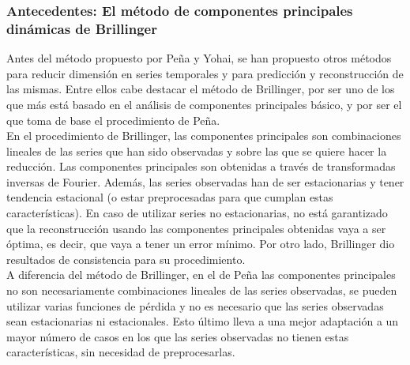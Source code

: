 \subsubsection{Antecedentes: El método de componentes principales dinámicas de Brillinger}

Antes del método propuesto por Peña y Yohai, se han propuesto otros métodos para reducir dimensión en series temporales y para predicción y reconstrucción de las mismas. Entre ellos cabe destacar el método de Brillinger, por ser uno de los que más está basado en el análisis de componentes principales básico, y por ser el que toma de base el procedimiento de Peña.\\

En el procedimiento de Brillinger, las componentes principales son combinaciones lineales de las series que han sido observadas y sobre las que se quiere hacer la reducción. Las componentes principales son obtenidas a través de transformadas inversas de Fourier. Además, las series observadas han de ser estacionarias y tener tendencia estacional (o estar preprocesadas para que cumplan estas características). En caso de utilizar series no estacionarias, no está garantizado que la reconstrucción usando las componentes principales obtenidas vaya a ser óptima, es decir, que vaya a tener un error mínimo. Por otro lado, Brillinger dio resultados de consistencia para su procedimiento.\\

A diferencia del método de Brillinger, en el de Peña las componentes principales no son necesariamente combinaciones lineales de las series observadas, se pueden utilizar varias funciones de pérdida y no es necesario que las series observadas sean estacionarias ni estacionales. Esto último lleva a una mejor adaptación a un mayor número de casos en los que las series observadas no tienen estas características, sin necesidad de preprocesarlas.\\


